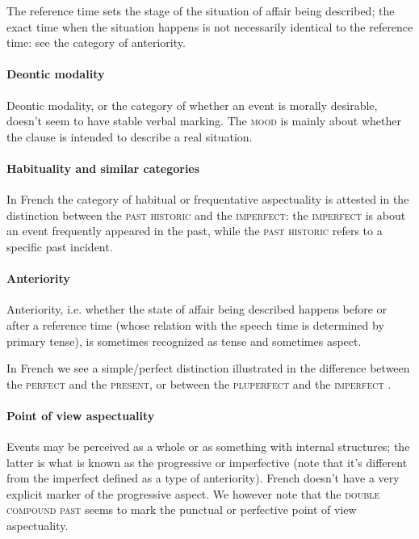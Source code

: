 \documentclass[a4paper, oneside, 12pt]{report}
\newcommand*{\citepage}[1]{p.~{#1}}
\newcommand*{\category}[1]{\textsc{#1}}
\begin{document}
The reference time sets the stage of the situation of affair being described;
the exact time when the situation happens is not necessarily identical to the reference time:
see the category of anteriority. 

\paragraph*{Deontic modality}
Deontic modality, or the category of whether an event is morally desirable,
doesn't seem to have stable verbal marking.
The \category{mood} is mainly about whether the clause is intended to describe a real situation.

\paragraph*{Habituality and similar categories}
In French the category of habitual or frequentative aspectuality is attested
in the distinction between the \category{past historic} and the \category{imperfect}:
the \category{imperfect} is about an event frequently appeared in the past,
while the \category{past historic} refers to a specific past incident.

\paragraph*{Anteriority}
Anteriority, i.e. whether the state of affair being described
happens before or after a reference time 
(whose relation with the speech time is determined by primary tense),
is sometimes recognized as tense and sometimes aspect.

In French we see a simple/perfect distinction illustrated
in the difference between the \category{perfect} and the \category{present},
or between the \category{pluperfect} and the \category{imperfect}
\citep[\citepage{148}]{l1999advanced}.

\paragraph*{Point of view aspectuality}
Events may be perceived as a whole or as something with internal structures;
the latter is what is known as the progressive or imperfective
(note that it's different from the imperfect defined as a type of anteriority).
French doesn't have a very explicit marker of the progressive aspect.
We however note that the \category{double compound past} \citep[\citepage{152}]{l1999advanced}
seems to mark the punctual or perfective point of view aspectuality.
\end{document}
